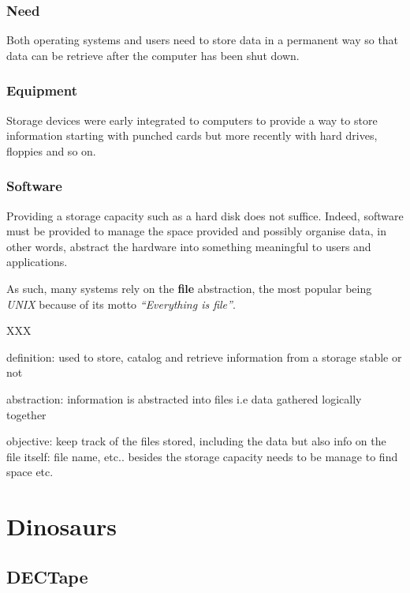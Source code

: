 
\begin{frame}
  \frametitle{Need}

  Both operating systems and users need to store data in a permanent way
  \ie{} so that data can be retrieve after the computer has been shut down.
\end{frame}


\begin{frame}
  \frametitle{Equipment}

  Storage devices were early integrated to computers to provide a way
  to store information starting with punched cards but more recently with
  hard drives, floppies and so on.
\end{frame}


\begin{frame}
  \frametitle{Software}

  Providing a storage capacity such as a hard disk does not suffice. Indeed,
  software must be provided to manage the space provided and possibly organise
  data, in other words, abstract the hardware into something meaningful to
  users and applications.

  \-

  As such, many systems rely on the \textbf{file} abstraction, the most popular
  being \textit{UNIX} because of its motto \textit{``Everything is file''}.
\end{frame}

XXX

definition: used to store, catalog and retrieve information from a storage
  stable or not

abstraction: information is abstracted into files i.e data gathered logically
  together

objective: keep track of the files stored, including the data but also info
  on the file itself: file name, etc.. besides the storage capacity needs to
  be manage to find space etc.

%
%

\section{Dinosaurs}


\subsection{DECTape}

